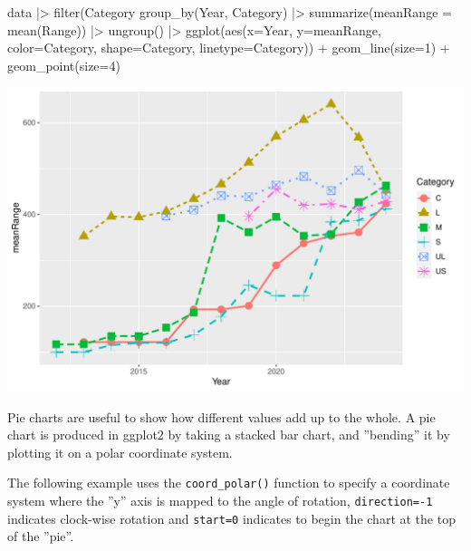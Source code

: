 \begin{samepage}
\begin{Rcode}
data |> 
  filter(Category %
  group_by(Year, Category) |>
  summarize(meanRange = mean(Range)) |>
  ungroup() |>
  ggplot(aes(x=Year, y=meanRange, 
             color=Category, 
             shape=Category, 
             linetype=Category)) +
    geom_line(size=1) + 
    geom_point(size=4)  
\end{Rcode}
\end{samepage}

\begin{center}
  \includegraphics[width=.8\textwidth]{fuel.linesPoints.pdf}
\end{center}




Pie charts are useful to show how different values add up to the whole. A pie chart is produced in ggplot2 by taking a stacked bar chart, and ''bending'' it by plotting it on a polar coordinate system. 

The following example uses the \texttt{coord\_polar()} function to specify a coordinate system where the ''y'' axis is mapped to the angle of rotation, \texttt{direction=-1} indicates clock-wise rotation and \texttt{start=0} indicates to begin the chart at the top of the ''pie''. 

